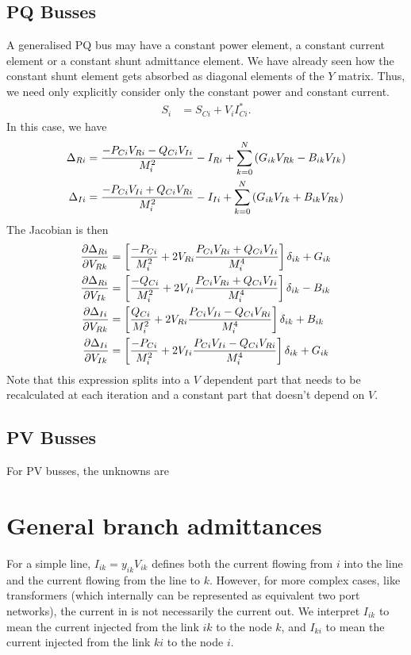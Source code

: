\documentclass[11pt]{article}
\begin{document}
\subsection{PQ Busses}
A generalised PQ bus may have a constant power element, a constant current element or a constant shunt admittance element. We have already seen how the constant shunt element gets absorbed as diagonal elements of the $Y$ matrix. Thus, we need only explicitly consider only the constant power and constant current.
\begin{align}
S_i &= S_{Ci} + V_iI^*_{Ci}.
\end{align}
In this case, we have
\begin{align}
\Delta_{Ri} &= \frac{-P_{Ci}V_{Ri}-Q_{Ci}V_{Ii}}{M^2_i} - I_{Ri} + \sum_{k=0}^N\left(G_{ik}V_{Rk} - B_{ik}V_{Ik}\right)\notag \\
\Delta_{Ii} &= \frac{-P_{Ci}V_{Ii}+Q_{Ci}V_{Ri}}{M^2_i} - I_{Ii} + \sum_{k=0}^N\left(G_{ik}V_{Ik} + B_{ik}V_{Rk}\right)
\end{align}
The Jacobian is then
\begin{align}
\frac{\partial \Delta_{Ri}}{\partial V_{Rk}} &= \left[\frac{-P_{Ci}}{M^2_i} + 2V_{Ri}\frac{P_{Ci}V_{Ri} + Q_{Ci}V_{Ii}}{M^4_i}\right]\delta_{ik}+G_{ik} \notag \\
\frac{\partial \Delta_{Ri}}{\partial V_{Ik}} &= \left[\frac{-Q_{Ci}}{M^2_i} + 2V_{Ii}\frac{P_{Ci}V_{Ri} + Q_{Ci}V_{Ii}}{M^4_i}\right]\delta_{ik}-B_{ik} \notag \\
\frac{\partial \Delta_{Ii}}{\partial V_{Rk}} &= \left[\frac{Q_{Ci}}{M^2_i} + 2V_{Ri}\frac{P_{Ci}V_{Ii} - Q_{Ci}V_{Ri}}{M^4_i} \right]\delta_{ik}+B_{ik} \notag \\
\frac{\partial \Delta_{Ii}}{\partial V_{Ik}} &= \left[\frac{-P_{Ci}}{M^2_i} + 2V_{Ii}\frac{P_{Ci}V_{Ii} - Q_{Ci}V_{Ri}}{M^4_i}\right]\delta_{ik}+G_{ik}
\end{align}
Note that this expression splits into a $V$ dependent part that needs to be recalculated at each iteration and a constant part that doesn't depend on $V$.
\subsection{PV Busses}
For PV busses, the unknowns are 

\section{General branch admittances}
For a simple line, $I_{ik} = y_{ik}V_{ik}$ defines both the current flowing from $i$ into the line and the current flowing from the line to $k$. However, for more complex cases, like transformers (which internally can be represented as equivalent two port networks), the current in is not necessarily the current out. We interpret $I_{ik}$ to mean the current injected from the link $ik$ to the node $k$, and $I_{ki}$ to mean the current injected from the link $ki$ to the node $i$.
\end{document}
